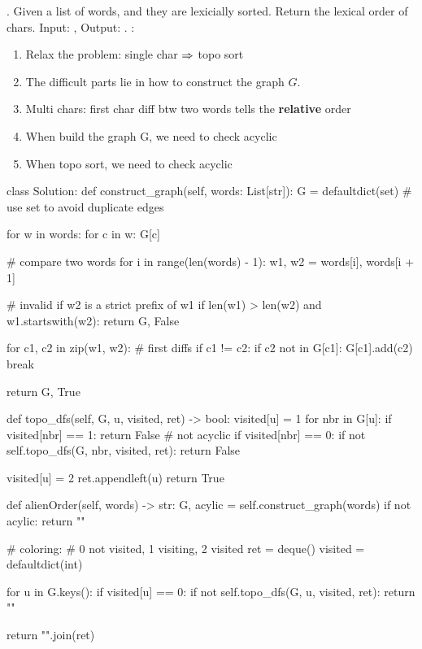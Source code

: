 . Given a list of words, and they are lexicially sorted. Return the lexical order of chars. Input: , Output: .
:
\begin{enumerate}
\item Relax the problem: single char $\Rightarrow$ topo sort 
\item The difficult parts lie in how to construct the graph $G$.
\item Multi chars: first char diff btw two words tells the \textbf{relative} order 
\item When build the graph G, we need to check acyclic 
\item When topo sort, we need to check acyclic
\end{enumerate}
\begin{python}

class Solution:
  def construct_graph(self, words: List[str]):
    G = defaultdict(set)  # use set to avoid duplicate edges

    for w in words:
      for c in w:
        G[c]

    # compare two words 
    for i in range(len(words) - 1):
      w1, w2 = words[i], words[i + 1]

      # invalid if w2 is a strict prefix of w1
      if len(w1) > len(w2) and w1.startswith(w2):
        return G, False

      for c1, c2 in zip(w1, w2):
        # first diffs
        if c1 != c2:
          if c2 not in G[c1]:
            G[c1].add(c2)
          break

    return G, True

  def topo_dfs(self, G, u, visited, ret) -> bool:
    visited[u] = 1
    for nbr in G[u]:
      if visited[nbr] == 1:
        return False  # not acyclic
      if visited[nbr] == 0:
        if not self.topo_dfs(G, nbr, visited, ret):
          return False

    visited[u] = 2
    ret.appendleft(u)
    return True
  
  def alienOrder(self, words) -> str:
    G, acylic = self.construct_graph(words)
    if not acylic:
      return ""

    # coloring: # 0 not visited, 1 visiting, 2 visited
    ret = deque()
    visited = defaultdict(int)

    for u in G.keys():
      if visited[u] == 0:
        if not self.topo_dfs(G, u, visited, ret):
          return ""

    return "".join(ret)
\end{python}

